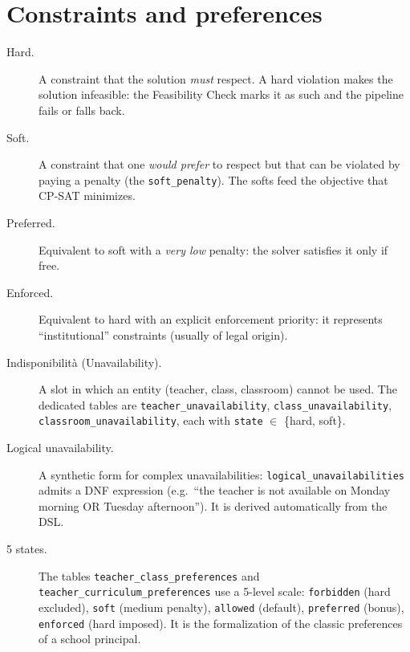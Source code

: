 \section{Constraints and preferences}

\begin{description}
\item[Hard.]
  A constraint that the solution \emph{must} respect. A hard
  violation makes the solution infeasible: the Feasibility Check
  marks it as such and the pipeline fails or falls back.

\item[Soft.]
  A constraint that one \emph{would prefer} to respect but that
  can be violated by paying a penalty (the
  \texttt{soft\_penalty}). The softs feed the objective that
  CP-SAT minimizes.

\item[Preferred.]
  Equivalent to soft with a \emph{very low} penalty: the solver
  satisfies it only if free.

\item[Enforced.]
  Equivalent to hard with an explicit enforcement priority: it
  represents ``institutional'' constraints (usually of legal
  origin).

\item[Indisponibilit\`a (Unavailability).]
  A slot in which an entity (teacher, class, classroom) cannot be
  used. The dedicated tables are
  \texttt{teacher\_unavailability},
  \texttt{class\_unavailability},
  \texttt{classroom\_unavailability}, each with \texttt{state}
  $\in$ \{hard, soft\}.

\item[Logical unavailability.]
  A synthetic form for complex unavailabilities:
  \texttt{logical\_unavailabilities} admits a DNF expression
  (e.g.\ ``the teacher is not available on Monday morning OR
  Tuesday afternoon''). It is derived automatically from the DSL.

\item[5 states.]
  The tables \texttt{teacher\_class\_preferences} and
  \texttt{teacher\_curriculum\_preferences} use a 5-level scale:
  \texttt{forbidden} (hard excluded), \texttt{soft} (medium
  penalty), \texttt{allowed} (default), \texttt{preferred}
  (bonus), \texttt{enforced} (hard imposed). It is the
  formalization of the classic preferences of a school principal.
\end{description}


